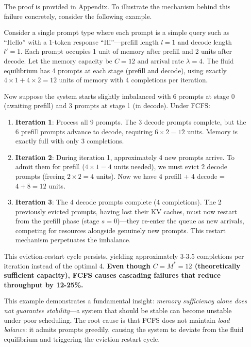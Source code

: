 The proof is provided in Appendix. To illustrate the mechanism behind this failure concretely, consider the following example.

\begin{example}
\label{ex:fcfs_cascade}
Consider a single prompt type where each prompt is a simple query such as ``Hello'' with a 1-token response ``Hi''---prefill length $l=1$ and decode length $l'=1$. Each prompt occupies 1 unit of memory after prefill and 2 units after decode. Let the memory capacity be $C=12$ and arrival rate $\lambda=4$. The fluid equilibrium has 4 prompts at each stage (prefill and decode), using exactly $4 \times 1 + 4 \times 2 = 12$ units of memory with 4 completions per iteration.

Now suppose the system starts slightly imbalanced with 6 prompts at stage 0 (awaiting prefill) and 3 prompts at stage 1 (in decode). Under FCFS:
\begin{enumerate}
    \item \textbf{Iteration 1}: Process all 9 prompts. The 3 decode prompts complete, but the 6 prefill prompts advance to decode, requiring $6 \times 2 = 12$ units. Memory is exactly full with only 3 completions.
    \item \textbf{Iteration 2}: During iteration 1, approximately 4 new prompts arrive. To admit them for prefill ($4 \times 1 = 4$ units needed), we must evict 2 decode prompts (freeing $2 \times 2 = 4$ units). Now we have 4 prefill + 4 decode = $4 + 8 = 12$ units.
    \item \textbf{Iteration 3}: The 4 decode prompts complete (4 completions). The 2 previously evicted prompts, having lost their KV caches, must now restart from the prefill phase (stage $s=0$)---they re-enter the queue as new arrivals, competing for resources alongside genuinely new prompts. This restart mechanism perpetuates the imbalance.
\end{enumerate}
This eviction-restart cycle persists, yielding approximately 3-3.5 completions per iteration instead of the optimal 4. \textbf{Even though $C = M^* = 12$ (theoretically sufficient capacity), FCFS causes cascading failures that reduce throughput by 12-25\%.}
\end{example}

This example demonstrates a fundamental insight: \emph{memory sufficiency alone does not guarantee stability}---a system that should be stable can become unstable under poor scheduling. The root cause is that FCFS does not maintain \emph{load balance}: it admits prompts greedily, causing the system to deviate from the fluid equilibrium and triggering the eviction-restart cycle.

